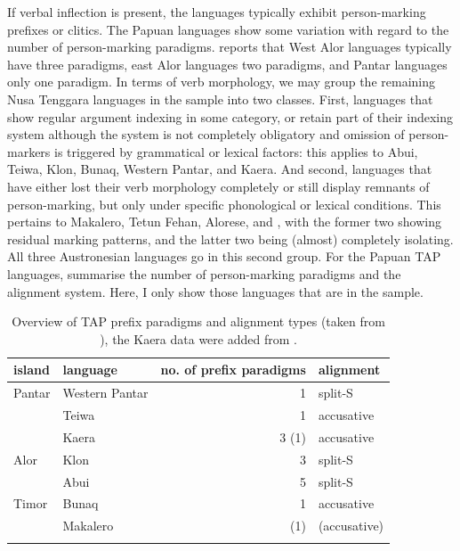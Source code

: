 If verbal inflection is present, the languages typically exhibit person-marking prefixes or clitics. The Papuan languages show some variation with regard to the number of person-marking paradigms. \citet{schapper2014intro} reports that West Alor languages typically have three paradigms, east Alor languages two paradigms, and Pantar languages only one paradigm. In terms of verb morphology, we may group the remaining Nusa Tenggara languages in the sample into two classes. First, languages that show regular argument indexing in some category, or retain part of their indexing system although the system is not completely obligatory and omission of person-markers is triggered by grammatical or lexical factors: this applies to Abui, Teiwa, Klon, Bunaq, Western Pantar, and Kaera. And second, languages that have either lost their verb morphology completely or still display remnants of person-marking, but only under specific phonological or lexical conditions. This pertains to Makalero, Tetun Fehan, Alorese, and , with the former two showing residual marking patterns, and the latter two being (almost) completely isolating. All three Austronesian languages go in this second group. For the Papuan TAP languages, \textcite{klamer2012development} summarise the number of person-marking paradigms and the alignment system. Here, I only show those languages that are in the sample.

\begin{table}
\begin{tabular}{l l r l}
\lsptoprule
island & language & no. of prefix paradigms & alignment \tabularnewline
\midrule
Pantar & Western Pantar & 1 & split-S \tabularnewline
 & Teiwa & 1 & accusative \tabularnewline
 & Kaera & 3 (1) & accusative \tabularnewline
 Alor & Klon & 3 & split-S \tabularnewline
 & Abui & 5 & split-S \tabularnewline
 Timor & Bunaq & 1 & accusative \tabularnewline
 & Makalero & (1) & (accusative) \tabularnewline
\lspbottomrule
\end{tabular}
\caption[Overview of TAP prefix paradigms and alignment types]{Overview of TAP prefix paradigms and alignment types (taken from \citealt[178]{klamer2012development}), the Kaera data were added from \citet[128]{klamer2014kaera}.}
\label{table:TAPprefixalign}
\end{table}

